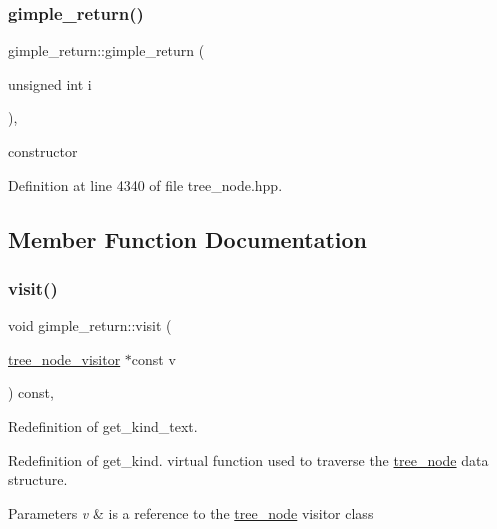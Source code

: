\subsubsection{\texorpdfstring{gimple\+\_\+return()}{gimple\_return()}}
{\footnotesize\ttfamily gimple\+\_\+return\+::gimple\+\_\+return (\begin{DoxyParamCaption}\item[{unsigned int}]{i }\end{DoxyParamCaption})\hspace{0.3cm}{\ttfamily [inline]}, {\ttfamily [explicit]}}



constructor 



Definition at line 4340 of file tree\+\_\+node.\+hpp.



\subsection{Member Function Documentation}
\mbox{\label{structgimple__return_a96de93cec9dfd2df931c05bfe673f532}} 
\subsubsection{\texorpdfstring{visit()}{visit()}}
{\footnotesize\ttfamily void gimple\+\_\+return\+::visit (\begin{DoxyParamCaption}\item[{\hyperlink{classtree__node__visitor}{tree\+\_\+node\+\_\+visitor} $\ast$const}]{v }\end{DoxyParamCaption}) const\hspace{0.3cm}{\ttfamily [override]}, {\ttfamily [virtual]}}



Redefinition of get\+\_\+kind\+\_\+text. 

Redefinition of get\+\_\+kind. virtual function used to traverse the \hyperlink{classtree__node}{tree\+\_\+node} data structure. 
\begin{DoxyParams}{Parameters}
{\em v} & is a reference to the \hyperlink{classtree__node}{tree\+\_\+node} visitor class \\
\hline
\end{DoxyParams}


